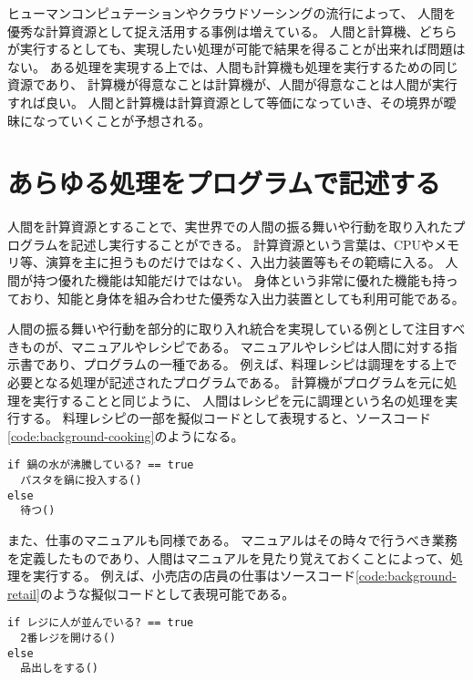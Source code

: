 ヒューマンコンピュテーションやクラウドソーシングの流行によって、
人間を優秀な計算資源として捉え活用する事例は増えている。
人間と計算機、どちらが実行するとしても、実現したい処理が可能で結果を得ることが出来れば問題はない。
ある処理を実現する上では、人間も計算機も処理を実行するための同じ資源であり、
計算機が得意なことは計算機が、人間が得意なことは人間が実行すれば良い。
人間と計算機は計算資源として等価になっていき、その境界が曖昧になっていくことが予想される。

\section{あらゆる処理をプログラムで記述する}\label{ux3042ux3089ux3086ux308bux51e6ux7406ux3092ux30d7ux30edux30b0ux30e9ux30e0ux3067ux8a18ux8ff0ux3059ux308b}

人間を計算資源とすることで、実世界での人間の振る舞いや行動を取り入れたプログラムを記述し実行することができる。
計算資源という言葉は、CPUやメモリ等、演算を主に担うものだけではなく、入出力装置等もその範疇に入る。
人間が持つ優れた機能は知能だけではない。
身体という非常に優れた機能も持っており、知能と身体を組み合わせた優秀な入出力装置としても利用可能である。

人間の振る舞いや行動を部分的に取り入れ統合を実現している例として注目すべきものが、マニュアルやレシピである。
マニュアルやレシピは人間に対する指示書であり、プログラムの一種である。
例えば、料理レシピは調理をする上で必要となる処理が記述されたプログラムである。
計算機がプログラムを元に処理を実行することと同じように、
人間はレシピを元に調理という名の処理を実行する。
料理レシピの一部を擬似コードとして表現すると、ソースコード\ref{code:background-cooking}のようになる。

\begin{lstlisting}[caption=料理レシピの一部を擬似コードで表す, label=code:background-cooking]
if 鍋の水が沸騰している? == true
  パスタを鍋に投入する()
else
  待つ()
\end{lstlisting}

また、仕事のマニュアルも同様である。
マニュアルはその時々で行うべき業務を定義したものであり、人間はマニュアルを見たり覚えておくことによって、処理を実行する。
例えば、小売店の店員の仕事はソースコード\ref{code:background-retail}のような擬似コードとして表現可能である。

\begin{lstlisting}[caption=小売店の店員の挙動の一部を擬似コードで表す, label=code:background-retail]
if レジに人が並んでいる? == true
  2番レジを開ける()
else
  品出しをする()
\end{lstlisting}

